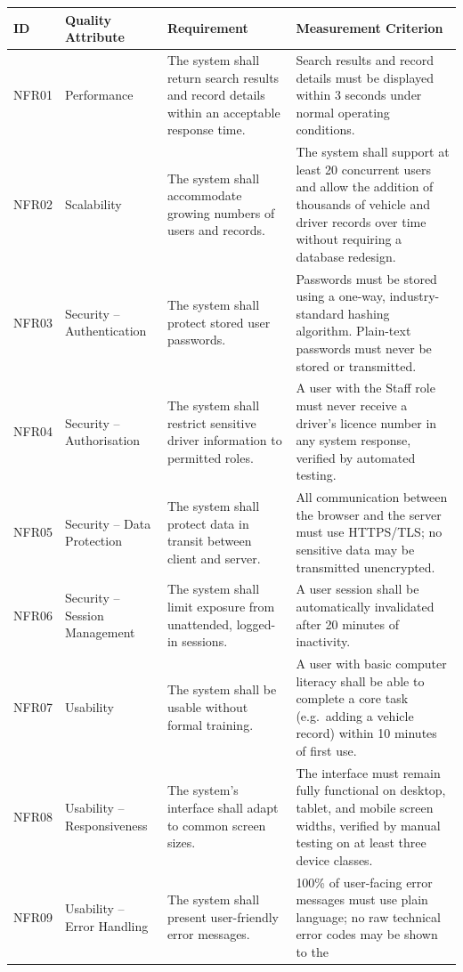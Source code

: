 \documentclass[11pt,a4paper]{article}
\begin{document}
\begin{longtable}{@{}p{1.3cm}p{2.4cm}p{5.2cm}p{5.6cm}@{}}
\toprule
ID & Quality Attribute & Requirement & Measurement Criterion \\
\midrule
\endhead
NFR01 & Performance & The system shall return search results and record
details within an acceptable response time. & Search results and record
details must be displayed within 3 seconds under normal operating
conditions. \\
NFR02 & Scalability & The system shall accommodate growing numbers of
users and records. & The system shall support at least 20 concurrent
users and allow the addition of thousands of vehicle and driver records
over time without requiring a database redesign. \\
NFR03 & Security -- Authentication & The system shall protect stored user
passwords. & Passwords must be stored using a one-way, industry-standard
hashing algorithm. Plain-text passwords must never be stored or
transmitted. \\
NFR04 & Security -- Authorisation & The system shall restrict sensitive
driver information to permitted roles. & A user with the Staff role must
never receive a driver's licence number in any system response,
verified by automated testing. \\
NFR05 & Security -- Data Protection & The system shall protect data in
transit between client and server. & All communication between the
browser and the server must use HTTPS/TLS; no sensitive data may be
transmitted unencrypted. \\
NFR06 & Security -- Session Management & The system shall limit exposure
from unattended, logged-in sessions. & A user session shall be
automatically invalidated after 20 minutes of inactivity. \\
NFR07 & Usability & The system shall be usable without formal training.
& A user with basic computer literacy shall be able to complete a core
task (e.g.\ adding a vehicle record) within 10 minutes of first use. \\
NFR08 & Usability -- Responsiveness & The system's interface shall adapt
to common screen sizes. & The interface must remain fully functional on
desktop, tablet, and mobile screen widths, verified by manual testing on
at least three device classes. \\
NFR09 & Usability -- Error Handling & The system shall present
user-friendly error messages. & 100\% of user-facing error messages must
use plain language; no raw technical error codes may be shown to the

\end{longtable}
\end{document}
